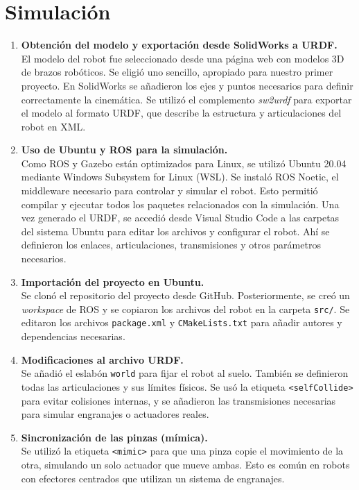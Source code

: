 \section{Simulación} \label{sec:simulacion}

\begin{enumerate}
	\item \textbf{Obtención del modelo y exportación desde SolidWorks a URDF.} \\
	El modelo del robot fue seleccionado desde una página web con modelos 3D de brazos robóticos. Se eligió uno sencillo, apropiado para nuestro primer proyecto. En SolidWorks se añadieron los ejes y puntos necesarios para definir correctamente la cinemática. Se utilizó el complemento \textit{sw2urdf} para exportar el modelo al formato URDF, que describe la estructura y articulaciones del robot en XML.
	
	\item \textbf{Uso de Ubuntu y ROS para la simulación.} \\
	Como ROS y Gazebo están optimizados para Linux, se utilizó Ubuntu 20.04 mediante Windows Subsystem for Linux (WSL). Se instaló ROS Noetic, el middleware necesario para controlar y simular el robot. Esto permitió compilar y ejecutar todos los paquetes relacionados con la simulación. Una vez generado el URDF, se accedió desde Visual Studio Code a las carpetas del sistema Ubuntu para editar los archivos y configurar el robot. Ahí se definieron los enlaces, articulaciones, transmisiones y otros parámetros necesarios.
	
	\item \textbf{Importación del proyecto en Ubuntu.} \\
	Se clonó el repositorio del proyecto desde GitHub. Posteriormente, se creó un \textit{workspace} de ROS y se copiaron los archivos del robot en la carpeta \texttt{src/}. Se editaron los archivos \texttt{package.xml} y \texttt{CMakeLists.txt} para añadir autores y dependencias necesarias.
	
	\item \textbf{Modificaciones al archivo URDF.} \\
	Se añadió el eslabón \texttt{world} para fijar el robot al suelo. También se definieron todas las articulaciones y sus límites físicos. Se usó la etiqueta \texttt{<selfCollide>} para evitar colisiones internas, y se añadieron las transmisiones necesarias para simular engranajes o actuadores reales.
	
	\item \textbf{Sincronización de las pinzas (mímica).} \\
	Se utilizó la etiqueta \texttt{<mimic>} para que una pinza copie el movimiento de la otra, simulando un solo actuador que mueve ambas. Esto es común en robots con efectores centrados que utilizan un sistema de engranajes.
	

\end{enumerate}
